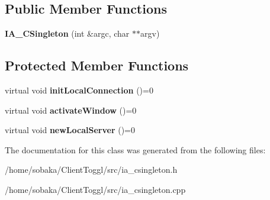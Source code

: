 \subsection*{Public Member Functions}
\begin{DoxyCompactItemize}
\item 
\mbox{\label{classIA__CSingleton_a39c3283903bc9ad778a81ad10985b9a7}} 
{\bfseries I\+A\+\_\+\+C\+Singleton} (int \&argc, char $\ast$$\ast$argv)
\end{DoxyCompactItemize}
\subsection*{Protected Member Functions}
\begin{DoxyCompactItemize}
\item 
\mbox{\label{classIA__CSingleton_a96c199a0b9eb08291c94c1cfec9e72b8}} 
virtual void {\bfseries init\+Local\+Connection} ()=0
\item 
\mbox{\label{classIA__CSingleton_a74f0cc5267ced57cfe8db280a43b14a5}} 
virtual void {\bfseries activate\+Window} ()=0
\item 
\mbox{\label{classIA__CSingleton_ab456381dafe2299b1f5709f02f0f2bde}} 
virtual void {\bfseries new\+Local\+Server} ()=0
\end{DoxyCompactItemize}


The documentation for this class was generated from the following files\+:\begin{DoxyCompactItemize}
\item 
/home/sobaka/\+Client\+Toggl/src/ia\+\_\+csingleton.\+h\item 
/home/sobaka/\+Client\+Toggl/src/ia\+\_\+csingleton.\+cpp\end{DoxyCompactItemize}
